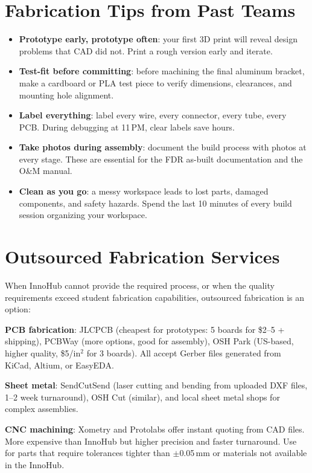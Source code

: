 \section{Fabrication Tips from Past Teams}
\begin{itemize}[nosep,leftmargin=1.5em]
\item \textbf{Prototype early, prototype often}: your first 3D print will reveal design problems that CAD did not. Print a rough version early and iterate.
\item \textbf{Test-fit before committing}: before machining the final aluminum bracket, make a cardboard or PLA test piece to verify dimensions, clearances, and mounting hole alignment.
\item \textbf{Label everything}: label every wire, every connector, every tube, every PCB. During debugging at 11\,PM, clear labels save hours.
\item \textbf{Take photos during assembly}: document the build process with photos at every stage. These are essential for the FDR as-built documentation and the O\&M manual.
\item \textbf{Clean as you go}: a messy workspace leads to lost parts, damaged components, and safety hazards. Spend the last 10 minutes of every build session organizing your workspace.
\end{itemize}



\section{Outsourced Fabrication Services}
When InnoHub cannot provide the required process, or when the quality requirements exceed student fabrication capabilities, outsourced fabrication is an option:

\textbf{PCB fabrication}: JLCPCB (cheapest for prototypes: 5 boards for \$2--5 + shipping), PCBWay (more options, good for assembly), OSH Park (US-based, higher quality, \$5/in$^2$ for 3 boards). All accept Gerber files generated from KiCad, Altium, or EasyEDA.

\textbf{Sheet metal}: SendCutSend (laser cutting and bending from uploaded DXF files, 1--2 week turnaround), OSH Cut (similar), and local sheet metal shops for complex assemblies.

\textbf{CNC machining}: Xometry and Protolabs offer instant quoting from CAD files. More expensive than InnoHub but higher precision and faster turnaround. Use for parts that require tolerances tighter than $\pm$0.05\,mm or materials not available in the InnoHub.

